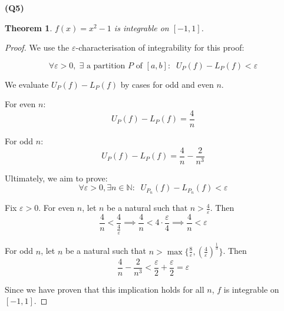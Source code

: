 \documentclass[12pt, a4paper]{article}
\renewcommand{\epsilon}{\varepsilon}
\newcommand{\N}{\mathbb{N}}
\newtheorem{theorem}{Theorem}
\begin{document}
\textbf{(Q5)}

\begin{theorem}
    $f(x) = x^2 - 1$ is integrable on $[-1, 1]$.
\end{theorem}

\begin{proof}
    We use the $\epsilon$-characterisation of integrability for this proof:

    \[
        \forall \epsilon > 0, \; \exists \text{ a partition $P$ of } [a,b] 
        \colon \;\; U_P(f) - L_P (f) < \epsilon
    \]

    We evaluate $U_P(f) - L_P(f)$ by cases for odd and even $n$.

    For even $n$:
    \[
        U_P(f) - L_P(f) = \frac{4}{n}
    \]

    For odd $n$:
    \[
        U_P(f) - L_P(f) = \frac{4}{n} - \frac{2}{n^3}
    \]

    Ultimately, we aim to prove:
    \[
        \forall \epsilon > 0, \exists n \in \N \colon \;\;
        U_{P_n}(f) - L_{P_n}(f)< \epsilon
    \]

    Fix $\epsilon > 0$. For even $n$, let $n$ be a natural such that $n > \frac{4}{\epsilon}$.
    Then \[
        \frac{4}{n} < \frac{4}{\frac{4}{\epsilon}} \implies
        \frac{4}{n} < 4 \cdot \frac{\epsilon}{4} \implies
        \frac{4}{n} < \epsilon
    \]

    For odd $n$, let $n$ be a natural such that 
    $n > \max\{\frac{8}{\epsilon}, \left(\frac{4}{\epsilon}\right)^{\frac{1}{3}}\}$. Then
    \[
        \frac{4}{n} - \frac{2}{n^3} < \frac{\epsilon}{2} + \frac{\epsilon}{2} = \epsilon
    \]

    Since we have proven that this implication holds for all $n$, $f$ is integrable on $[-1, 1]$.

\end{proof}
\end{document}
